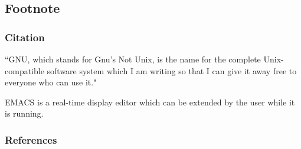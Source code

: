 \documentclass{beamer}
\begin{document}
\subsection{Footnote}
\begin{frame}
	\frametitle{Citation} 
	\begin{block}{}
	``GNU, which stands for Gnu's Not Unix, is 
	the name for the complete Unix-compatible software system which 
	I am writing so that I can give it away free to everyone who can 
	use it\footnotemark."
	\end{block}
	EMACS is a real-time display editor which can be extended by the 
	user while it is running.
\end{frame}


\begin{frame}
	\frametitle{References}
	\nocite{*}
	\printbibliography
\end{frame}

\end{document}
